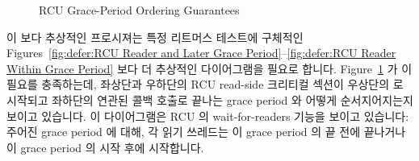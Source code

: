 \begin{figure}[tb]
\centering
{}
\caption{RCU Grace-Period Ordering Guarantees}
\label{fig:defer:RCU Grace-Period Ordering Guarantees}
\end{figure}

이 보다 추상적인 프로시져는 특정 리트머스 테스트에 구체적인
Figures~\ref{fig:defer:RCU Reader and Later Grace Period}--\ref{fig:defer:RCU Reader Within Grace Period}
보다 더 추상적인 다이어그램을 필요로 합니다.
Figure~\ref{fig:defer:RCU Grace-Period Ordering Guarantees}
가 이 필요를 충족하는데, 좌상단과 우하단의 RCU read-side 크리티컬 섹션이
우상단의  로 시작되고 좌하단의 연관된 콜백 호출로 끝나는 grace
period 와 어떻게 순서지어지는지 보이고 있습니다.
이 다이어그램은 RCU 의 wait-for-readers 기능을 보이고 있습니다:
주어진 grace period 에 대해, 각 읽기 쓰레드는 이 grace period 의 끝 전에
끝나거나 이 grace period 의 시작 후에 시작합니다.

